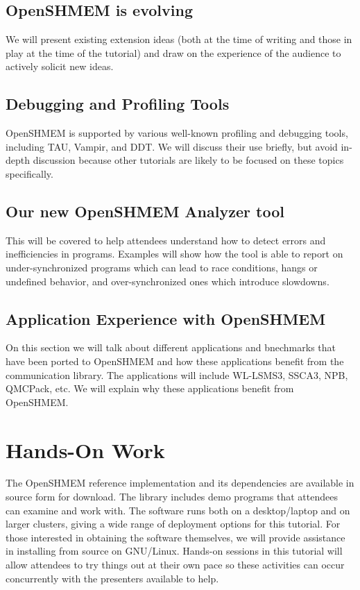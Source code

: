 \documentclass[10pt,english]{article}
\begin{document}
\subsection{OpenSHMEM is evolving}

  We will present existing extension ideas (both at the time of
  writing and those in play at the time of the tutorial) and draw on
  the experience of the audience to actively solicit new ideas.

\subsection{Debugging and Profiling Tools}

  OpenSHMEM is supported by various well-known profiling and debugging
  tools, including TAU, Vampir, and DDT.  We will discuss their use
  briefly, but avoid in-depth discussion because other tutorials are
  likely to be focused on these topics specifically.

\subsection{Our new OpenSHMEM Analyzer tool}

  This will be covered to help attendees understand how to detect
  errors and inefficiencies in programs.  Examples will show how the
  tool is able to report on under-synchronized programs which can lead
  to race conditions, hangs or undefined behavior, and
  over-synchronized ones which introduce slowdowns.
  
\subsection {Application Experience with OpenSHMEM}
On this section we will talk about different applications and bnechmarks that
have been ported to OpenSHMEM and how these applications benefit
from the communication library. The applications will include WL-LSMS3, 
SSCA3,  NPB, QMCPack, etc. We will explain why these applications benefit
from OpenSHMEM.

\section{Hands-On Work}

The OpenSHMEM reference implementation and its dependencies are
available in source form for download.  The library includes demo
programs that attendees can examine and work with.  The software runs
both on a desktop/laptop and on larger clusters, giving a wide range
of deployment options for this tutorial.  For those interested in
obtaining the software themselves, we will provide assistance in
installing from source on GNU/Linux.  Hands-on sessions in this
tutorial will allow attendees to try things out at their own pace so
these activities can occur concurrently with the presenters available
to help.
\end{document}
